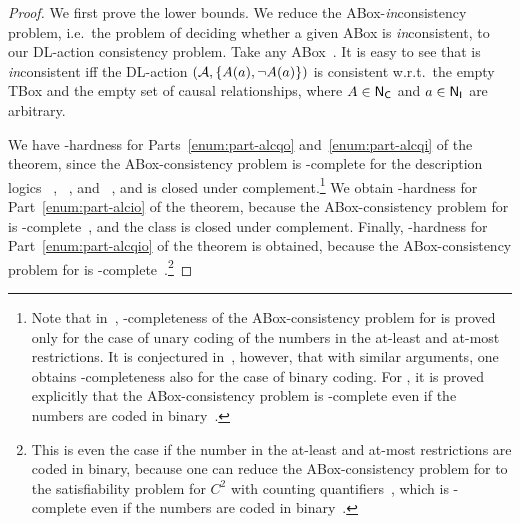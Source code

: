 \begin{proof}
    We first prove the lower bounds.  We reduce the ABox-\emph{in}consistency
    problem, i.e.~the problem of deciding whether a given ABox is
    \emph{in}consistent, to our DL-action consistency problem.  Take any
    ABox~\Amc.  It is easy to see that \Amc is \emph{in}consistent iff the
    DL-action $(\mathcal{A},\{A(a),\lnot A(a)\})$ is consistent w.r.t.\ the
    empty TBox and the empty set of causal relationships, where $A\in\mathsf{N_C}$ and
    $a\in\mathsf{N_I}$ are arbitrary.

    We have \PSpace-hardness for Parts~\ref{enum:part-alcqo}
    and~\ref{enum:part-alcqi} of the theorem, since
    the ABox-consistency problem is \PSpace-complete for the description
    logics
    \ALC~\cite{ScSm-AIJ91}, \ALCQO~\cite{Sch-DKE94,BLM+-LTCS-05-02}, and
    \ALCQI~\cite{Tob-PhD01}, and \PSpace is closed under complement.\footnote{%
        Note that in~\cite{BLM+-LTCS-05-02}, \PSpace-completeness of the
        ABox-consistency problem for \ALCQO is proved only for the case of unary
        coding of the numbers in the at-least and at-most restrictions.  It is
        conjectured in~\cite{BLM+-LTCS-05-02}, however, that with similar
        arguments, one obtains \PSpace-completeness also for the case of binary
        coding.  For \ALCQI, it is proved explicitly that the ABox-consistency
        problem is \PSpace-complete even if the numbers are coded in
        binary~\cite{Tob-PhD01}.}
    We obtain \ExpTime-hardness for Part~\ref{enum:part-alcio} of the theorem,
    because the ABox-consistency problem for \ALCIO is
    \ExpTime-complete~\cite{ArBM-CSL99}, and the class \ExpTime is closed under
    complement.  Finally, \coNExpTime-hardness for Part~\ref{enum:part-alcqio}
    of the theorem is obtained, because the ABox-consistency problem for \ALCQIO
    is \NExpTime-complete~\cite{Sch-DKE94,Tob-JAIR00,Pra-JLLI05}.\footnote{%
        This is even the case if the number in the at-least and at-most
        restrictions are coded in binary, because one can reduce the
        ABox-consistency problem for \ALCQIO to the satisfiability problem for
        $C^2$ with counting quantifiers~\cite{BLM+-LTCS-05-02}, which is
        \NExpTime-complete even if the numbers are coded in
        binary~\cite{Pra-JLLI05}.}


\end{proof}
